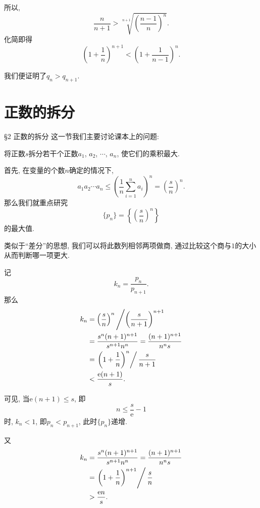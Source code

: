 \documentclass[serif]{beamer}
\begin{document}
\begin{frame}
	所以,
	\[\frac{n}{n+1}>\sqrt[n+1]{\left(\frac{n-1}{n}\right)^n}.\]
	化简即得
	\[\left(1+\frac{1}{n}\right)^{n+1}<\left(1+\frac{1}{n-1}\right)^n.\]\par
	我们便证明了$q_n>q_{n+1}.$
\end{frame}

\section{\heiti 正数的拆分}

\begin{frame}{\S2 正数的拆分}
	这一节我们主要讨论课本上的问题:\par
	{\kaishu 将正数$s$拆分若干个正数$a_1$, $a_2$, $\cdots$, $a_n$, 使它们的乘积最大. }\par
	首先, 在变量的个数$n$确定的情况下, 
	\[a_1a_2\cdots a_n\le\left(\frac{1}{n}\sum\limits_{i=1}^{n}a_i\right)^n=\left(\frac{s}{n}\right)^n.\]
	那么我们就重点研究
	\[\{p_n\}=\left\{\left(\frac{s}{n}\right)^n\right\}\]
	的最大值.
\end{frame}

\begin{frame}
	类似于“差分”的思想, 我们可以将此数列相邻两项做商, 通过比较这个商与$1$的大小从而判断哪一项更大. \par
	记
	\[k_n=\frac{p_n}{p_{n+1}}.\]
	那么
	\begin{align*}
		k_n&=\left(\frac{s}{n}\right)^n\left/\left(\frac{s}{n+1}\right)^{n+1}\right.\\
		&=\frac{s^n(n+1)^{n+1}}{s^{n+1}n^n}=\frac{(n+1)^{n+1}}{n^ns}\\
		&=\left.\left(1+\frac{1}{n}\right)^n\right/\frac{s}{n+1}\\
		&<\frac{\mathrm{e}(n+1)}{s}.
	\end{align*}
\end{frame}

\begin{frame}
	可见, 当$\mathrm{e}(n+1)\le s$, 即
	\[n\le\frac{s}{\mathrm{e}}-1\]
	时, $k_n<1$, 即$p_n<p_{n+1}$, 此时$\{p_n\}$递增.\par 
	又
	\begin{align*}
		k_n		&=\frac{s^n(n+1)^{n+1}}{s^{n+1}n^n}=\frac{(n+1)^{n+1}}{n^ns}\\
		&=\left.\left(1+\frac{1}{n}\right)^{n+1}\right/\frac{s}{n}\\
		&>\frac{\mathrm{e}n}{s}.
	\end{align*}
\end{frame}
\end{document}
